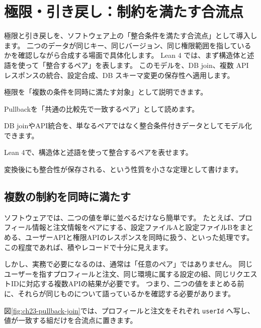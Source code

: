 \chapter{極限・引き戻し：制約を満たす合流点}
\label{chap:limits-pullbacks}

\begin{chapterabstract}
極限と引き戻しを、ソフトウェア上の「整合条件を満たす合流点」として導入します。
二つのデータが同じキー、同じバージョン、同じ権限範囲を指しているかを確認しながら合成する場面で具体化します。
Lean 4 では、まず構造体と述語を使って「整合するペア」を表します。
このモデルを、DB join、複数 API レスポンスの統合、設定合成、DB スキーマ変更の保存性へ適用します。
\end{chapterabstract}

\begin{learninggoals}
\item 極限を「複数の条件を同時に満たす対象」として説明できます。
\item Pullbackを「共通の比較先で一致するペア」として読めます。
\item DB joinやAPI統合を、単なるペアではなく整合条件付きデータとしてモデル化できます。
\item Lean 4で、構造体と述語を使って整合するペアを表せます。
\item 変換後にも整合性が保存される、という性質を小さな定理として書けます。
\end{learninggoals}

\section{複数の制約を同時に満たす}

ソフトウェアでは、二つの値を単に並べるだけなら簡単です。
たとえば、プロフィール情報と注文情報をペアにする、設定ファイルAと設定ファイルBをまとめる、ユーザーAPIと権限APIのレスポンスを同時に扱う、といった処理です。
この程度であれば、積やレコードで十分に見えます。

しかし、実務で必要になるのは、通常は「任意のペア」ではありません。
同じユーザーを指すプロフィールと注文、同じ環境に属する設定の組、同じリクエストIDに対応する複数APIの結果が必要です。
つまり、二つの値をまとめる前に、それらが同じものについて語っているかを確認する必要があります。

図\ref{fig:ch23-pullback-join}では、プロフィールと注文をそれぞれ \texttt{userId} へ写し、値が一致する組だけを合流点に置きます。

